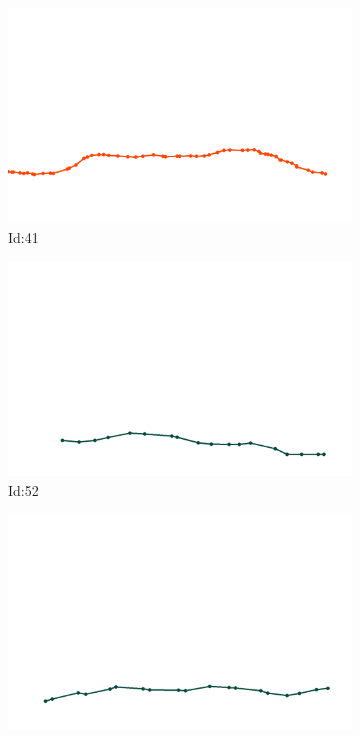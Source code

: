 \documentclass[12pt,twoside]{report}
\begin{document}
\begin{figure}
\centering
\begin{subfigure}[b]{0.20\textwidth}
\centering
\includegraphics[width=\textwidth]{../trajectories/41.png}
\caption{Id:41}
\end{subfigure}
\begin{subfigure}[b]{0.20\textwidth}
\centering
\includegraphics[width=\textwidth]{../trajectories/52.png}
\caption{Id:52}
\end{subfigure}
\begin{subfigure}[b]{0.20\textwidth}
\centering
\includegraphics[width=\textwidth]{../trajectories/94.png}

\end{subfigure}
\end{figure}
\end{document}
